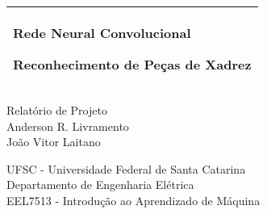 \begin{titlepage}
  \noindent%
  \begin{tabular}{@{}p{\textwidth}@{}}
    \toprule[2pt]
    \midrule
    \vspace{0.2cm}
    \begin{center}
    \Huge{\textbf{
      Rede Neural Convolucional
    }}
    \end{center}
    \begin{center}
      \Large{
        Reconhecimento de Peças de Xadrez
      }
    \end{center}
    \vspace{0.2cm}\\
    \midrule
    \toprule[2pt]
  \end{tabular}
  \vspace{4 cm}
  \begin{center}
    {\large
      Relatório de Projeto
    }\\
    \vspace{0.2cm}
    {\Large
      Anderson R. Livramento\\
      João Vitor Laitano
    }
  \end{center}
  \vfill
 {\raggedright
  UFSC - Universidade Federal de Santa Catarina\\
  Departamento de Engenharia Elétrica\\
  EEL7513 - Introdução ao Aprendizado de Máquina
 \par}
\end{titlepage}
\clearpage
